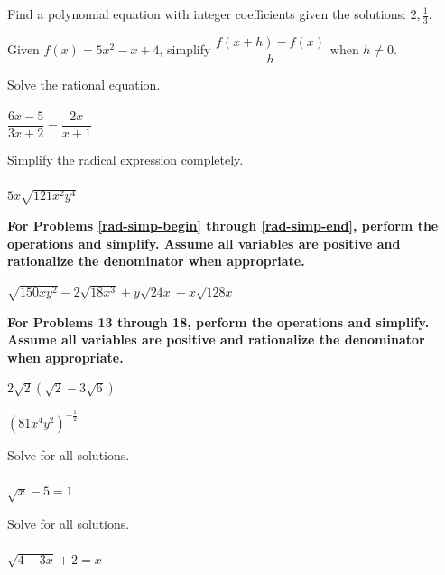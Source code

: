 \documentclass[addpoints,12pt,answers]{exam}
\begin{document}
\begin{questions}
\newpage

\question[5] Find a polynomial equation with integer coefficients given the solutions: $2, \frac{1}{3}$.
 \answerline

\question[5] Given $f(x)=5x^2-x+4$, simplify $\dfrac{f(x+h)-f(x)}{h}$ when $h\neq 0$.
\answerline

\newpage

\question[5] Solve the rational equation.\\ \\ $\dfrac{6x-5}{3x+2} = \dfrac{2x}{x+1}$
\answerline

\question[5] Simplify the radical expression completely.\\ \\ $5x\sqrt{121x^2y^4}$
\answerline

\newpage

\textbf{For Problems \ref{rad-simp-begin} through \ref{rad-simp-end}, perform the operations and simplify.  Assume all variables are positive and rationalize the denominator when appropriate.}

\question[5]\label{rad-simp-begin} $\sqrt{150xy^2}-2\sqrt{18x^3}+y\sqrt{24x}+x\sqrt{128x}$
\answerline

\newpage

\textbf{For Problems 13 through 18, perform the operations and simplify.  Assume all variables are positive and rationalize the denominator when appropriate.}

\question[5] $2\sqrt{2}(\sqrt{2}-3\sqrt{6})$
\answerline

\question[5]\label{rad-simp-end} $(81x^4y^2)^{-\frac{1}{2}}$
\answerline

\newpage

\question[5] Solve for all solutions.\\ \\ $\sqrt{x}-5=1$
\answerline

\question[5] Solve for all solutions.\\ \\ $\sqrt{4-3x}+2=x$
\answerline


\end{questions}
\end{document}
